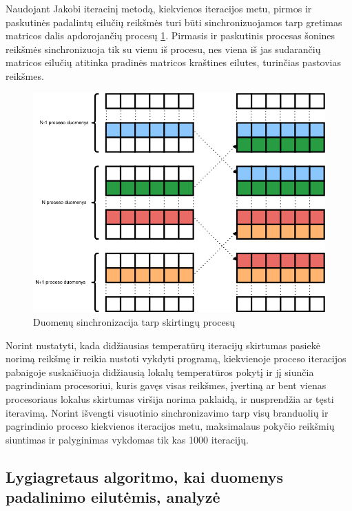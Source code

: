 \documentclass{VUMIFPSbakalaurinis}
\begin{document}
Naudojant Jakobi iteracinį metodą, kiekvienos iteracijos metu, pirmos ir paskutinės padalintų eilučių reikšmės turi būti sinchronizuojamos tarp gretimas matricos dalis apdorojančių procesų \ref{img:sync}. 
Pirmasis ir paskutinis procesas šonines reikšmės sinchronizuoja tik su vienu iš procesu, nes viena iš jas sudarančių matricos eilučių atitinka pradinės matricos kraštines eilutes, turinčias pastovias reikšmes.

\begin{figure}[H]
    \centering
    \includegraphics[scale=0.5]{img/sync.png}
    \caption{Duomenų sinchronizacija tarp skirtingų procesų}
    \label{img:sync}
\end{figure}

Norint nustatyti, kada didžiausias temperatūrų iteracijų skirtumas pasiekė norimą reikšmę ir reikia nustoti vykdyti programą, kiekvienoje proceso iteracijos pabaigoje suskaičiuoja didžiausią lokalų temperatūros pokytį ir jį siunčia pagrindiniam procesoriui, 
kuris gavęs visas reikšmes, įvertiną ar bent vienas procesoriaus lokalus skirtumas viršija norima paklaidą, ir nusprendžia ar tęsti iteravimą.
Norint išvengti visuotinio sinchronizavimo tarp visų branduolių ir pagrindinio proceso kiekvienos iteracijos metu, maksimalaus pokyčio reikšmių siuntimas ir palyginimas vykdomas tik kas 1000 iteracijų.

\subsection{Lygiagretaus algoritmo, kai duomenys padalinimo eilutėmis, analyzė}
\end{document}
